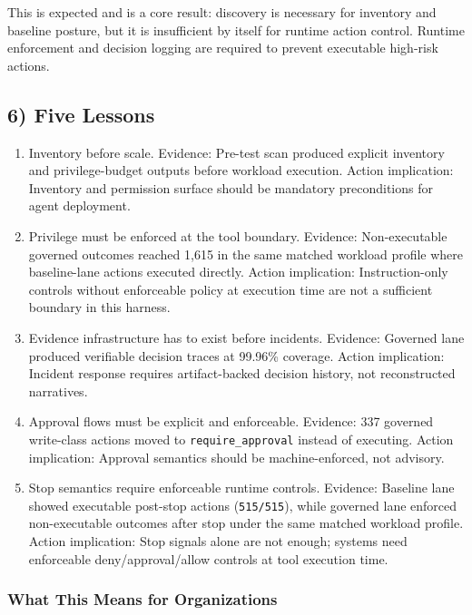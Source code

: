 \documentclass[
]{article}
\begin{document}
This is expected and is a core result: discovery is necessary for
inventory and baseline posture, but it is insufficient by itself for
runtime action control. Runtime enforcement and decision logging are
required to prevent executable high-risk actions.

\subsection{6) Five Lessons}\label{6-five-lessons}

\begin{enumerate}
\def\labelenumi{\arabic{enumi}.}
\item
  Inventory before scale. Evidence: Pre-test scan produced explicit
  inventory and privilege-budget outputs before workload execution.
  Action implication: Inventory and permission surface should be
  mandatory preconditions for agent deployment.
\item
  Privilege must be enforced at the tool boundary. Evidence:
  Non-executable governed outcomes reached 1,615 in the same matched
  workload profile where baseline-lane actions executed directly. Action
  implication: Instruction-only controls without enforceable policy at
  execution time are not a sufficient boundary in this harness.
\item
  Evidence infrastructure has to exist before incidents. Evidence:
  Governed lane produced verifiable decision traces at 99.96\% coverage.
  Action implication: Incident response requires artifact-backed
  decision history, not reconstructed narratives.
\item
  Approval flows must be explicit and enforceable. Evidence: 337
  governed write-class actions moved to \texttt{require\_approval}
  instead of executing. Action implication: Approval semantics should be
  machine-enforced, not advisory.
\item
  Stop semantics require enforceable runtime controls. Evidence:
  Baseline lane showed executable post-stop actions (\texttt{515/515}),
  while governed lane enforced non-executable outcomes after stop under
  the same matched workload profile. Action implication: Stop signals
  alone are not enough; systems need enforceable deny/approval/allow
  controls at tool execution time.
\end{enumerate}

\subsubsection{What This Means for
Organizations}\label{what-this-means-for-organizations}
\end{document}
